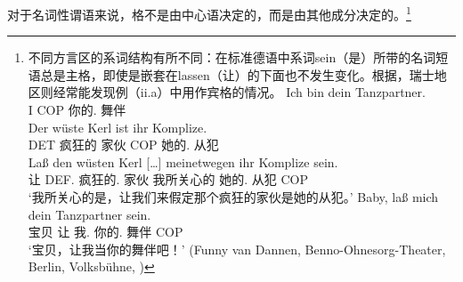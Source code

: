 对于名词性谓语来说，格不是由中心语决定的，而是由其他成分决定的。\footnote{
不同方言区的系词结构有所不同：在标准德语中系词sein（是）所带的名词短语总是主格，即使是嵌套在lassen（让）的下面也不发生变化。根据\citet*[{\S}\,1259]{Duden95-Authors}，瑞士地区则经常能发现例（ii.a）中用作宾格的情况。
	\eal
\ex 
\gll Ich bin dein Tanzpartner.\\
     I COP 你的.\nom{} 舞伴\\
\ex 
\gll Der wüste Kerl ist ihr Komplize.\\
     DET 疯狂的  家伙  COP  她的.\nom{} 从犯\\
\ex 
\gll Laß den wüsten Kerl [\ldots] meinetwegen ihr Komplize sein.\\
     让 DEF.\acc{} 疯狂的.\acc{} 家伙 {} 我所关心的 她的.\nom{} 从犯 COP\\
\glt `我所关心的是，让我们来假定那个疯狂的家伙是她的从犯。'  \citep*[{\S}\,6925]{Duden66-Authors}
\ex 
\gll Baby, laß mich dein Tanzpartner sein.\\
     宝贝 让 我.\acc{} 你的.\nom{} 舞伴 COP\\
\glt `宝贝，让我当你的舞伴吧！'  (Funny van Dannen, Benno-Ohnesorg-Theater, Berlin, Volksbühne, )
\zl

        \eal
        \zllast}
        
